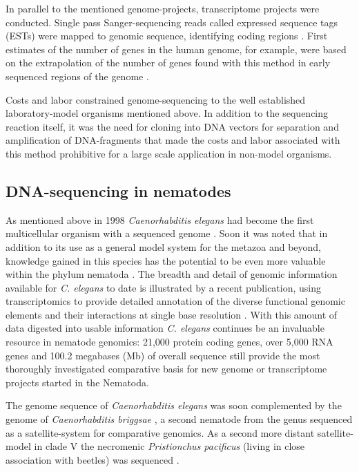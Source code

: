 In parallel to the mentioned genome-projects, transcriptome projects
were conducted. Single pass Sanger-sequencing reads called expressed
sequence tags (ESTs) were mapped to genomic sequence, identifying
coding regions \cite{pmid2047873}. First estimates of the number of
genes in the human genome, for example, were based on the
extrapolation of the number of genes found with this method in early
sequenced regions of the genome \cite{pmid7920649}.

Costs and labor constrained genome-sequencing to the well established
laboratory-model organisms mentioned above. In addition to the
sequencing reaction itself, it was the need for cloning into DNA
vectors for separation and amplification of DNA-fragments that made
the costs and labor associated with this method prohibitive for a
large scale application in non-model organisms.

\subsection{DNA-sequencing in nematodes}
\label{sec:dna-sequ-nemat}

As mentioned above in 1998 \textit{Caenorhabditis elegans} had become
the first multicellular organism with a sequenced genome
\cite{pmid9851916}. Soon it was noted that in addition to its use as a
general model system for the metazoa and beyond, knowledge gained in
this species has the potential to be even more valuable within the
phylum nematoda \cite{blaxter_caenorhabditis_1998}. The breadth and
detail of genomic information available for \textit{C. elegans} to
date is illustrated by a recent publication, using transcriptomics to
provide detailed annotation of the diverse functional genomic elements
and their interactions at single base resolution
\cite{pmid21177976}. With this amount of data digested into usable
information \textit{C. elegans} continues be an invaluable resource in
nematode genomics: 21,000 protein coding genes, over 5,000 RNA genes
and 100.2 megabases (Mb) of overall sequence still provide the most
thoroughly investigated comparative basis for new genome or
transcriptome projects started in the Nematoda.

The genome sequence of \textit{Caenorhabditis elegans} was soon
complemented by the genome of \textit{Caenorhabditis briggsae}
\cite{stein_genome_2003}, a second nematode from the genus sequenced
as a satellite-system for comparative genomics. As a second more
distant satellite-model in clade V the necromenic \textit{Pristionchus
  pacificus} (living in close association with beetles) was sequenced
\cite{pmid18806794}.

